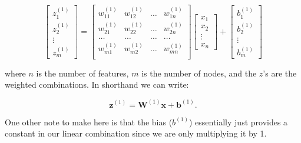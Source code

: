 \[
\begin{bmatrix}
           z^{(1)}_{1} \\
           z^{(1)}_{2} \\
           \vdots \\
           z^{(1)}_{m}
         \end{bmatrix}
         =
\left[
  \begin{array}{cccc}
    w^{(1)}_{11} & w^{(1)}_{12} & \hdots & w^{(1)}_{1n} \\
    w^{(1)}_{21} & w^{(1)}_{22} & \hdots & w^{(1)}_{2n} \\
    \hdots &  \hdots  & \hdots &  \hdots \\
    w^{(1)}_{m1} & w^{(1)}_{m2} & \hdots & w^{(1)}_{mn} \\ 
  \end{array}
\right]
\begin{bmatrix}
           x_{1} \\
           x_{2} \\
           \vdots \\
           x_{n}
         \end{bmatrix}
+
\begin{bmatrix}
           b^{(1)}_{1} \\
           b^{(1)}_{2} \\
           \vdots \\
           b^{(1)}_{m}
         \end{bmatrix}
\]

\noindent where $n$ is the number of features, $m$ is the number of nodes, and the $z$'s are the weighted combinations. In shorthand we can write:

\begin{equation}
\mathbf{z}^{(1)} = \mathbf{W}^{(1)} \mathbf{x} + \mathbf{b}^{(1)}.
\end{equation}

One other note to make here is that the bias ($b^{(1)}$) essentially just provides a constant in our linear combination since we are only multiplying it by 1. 

